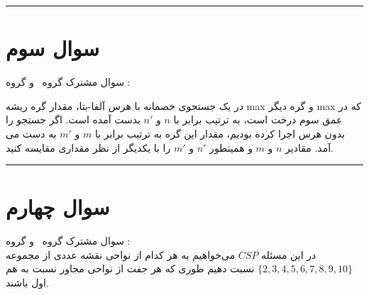 \documentclass[a4paper,10pt]{article}
\newcommand{\GroupA}{\noindent \textcolor{AccentGold}{گروه \lr{a}}}
\newcommand{\GroupB}{\noindent\textcolor{AccentCyan}{گروه \lr{b}}}
\begin{document}
\bigskip
\textcolor{AccentCyan}{\rule{\linewidth}{0.4pt}}
\section{\textcolor{AccentGold}{سوال سوم}}
	
	سوال مشترک \GroupA \, و \GroupB: 
\vspace{0.1cm}
\\
\noindent
	
	در یک جستجوی خصمانه با هرس آلفا-بتا، مقدار گره ریشه max و گره دیگر max که در عمق سوم درخت است، به ترتیب برابر با 
$n$
و 
$n'$
بدست آمده است. اگر جستجو را بدون هرس اجرا کرده بودیم، مقدار این گره به ترتیب برابر با 
$m$
و
$m'$
به دست می آمد. مقادیر 
$n$
و
$m$
و همینطور
$n'$
و 
$m'$
را با یکدیگر از نظر مقداری مقایسه کنید.

\textcolor{AccentCyan}{\rule{\linewidth}{0.4pt}}

\section{\textcolor{AccentGold}{سوال چهارم}}

	سوال مشترک \GroupA \, و \GroupB: 
\vspace{0.2cm}
\\
\noindent
 در این مسئله $CSP$ می‌خواهیم به هر کدام از نواحی نقشه عددی از مجموعه 
$\{2, 3, 4, 5, 6, 7, 8, 9, 10\}$ 
نسبت دهیم طوری که هر جفت از نواحی مجاور نسبت به هم اول باشند.


\end{document}
